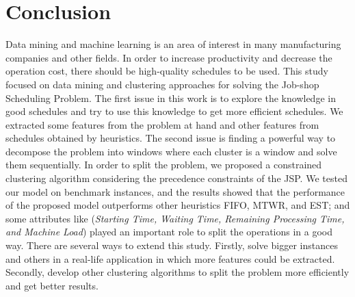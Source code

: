 \documentclass{article}
\begin{document}
\section{Conclusion}
Data mining and machine learning is an area of interest in many manufacturing companies and other fields. In order to increase productivity and decrease the operation cost, there should be high-quality schedules to be used. This study focused on data mining and clustering approaches for solving the Job-shop Scheduling Problem. The first issue in this work is to explore the knowledge in good schedules and try to use this knowledge to get more efficient schedules. We extracted some features from the problem at hand and other features from schedules obtained by heuristics. The second issue is finding a powerful way to decompose the problem into windows where each cluster is a window and solve them sequentially. In order to split the problem, we proposed a constrained clustering algorithm considering the precedence constraints of the JSP. We tested our model on benchmark instances, and the results showed that the performance of the proposed model outperforms other heuristics FIFO, MTWR, and EST; and some attributes like (\textit{Starting Time, Waiting Time, Remaining Processing Time, and Machine Load}) played an important role to split the operations in a good way. There are several ways to extend this study. Firstly, solve bigger instances and others in a real-life application in which more features could be extracted. Secondly, develop other clustering algorithms to split the problem more efficiently and get better results.

\newpage


\end{document}
